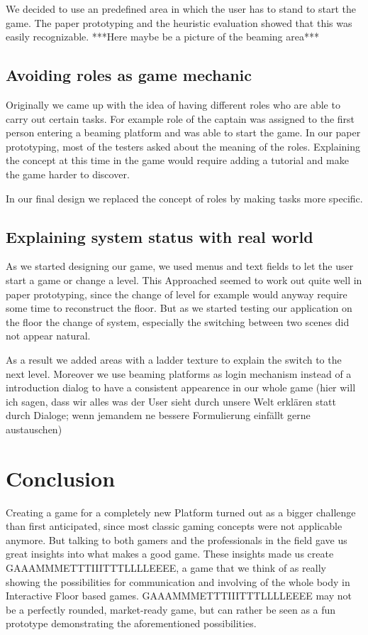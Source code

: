 \documentclass{sigchi}
\begin{document}
We decided to use an predefined area in which the user has to stand to start the game. The paper prototyping and the heuristic evaluation showed that this was easily recognizable. 
***Here maybe be a picture of the beaming area*** 


\subsection{Avoiding roles as game mechanic}
\vspace{1mm}
Originally we came up with the idea of having different roles who are able to carry out certain tasks. For example role of the captain was assigned to the first person entering a beaming platform and was able to start the game. In our paper prototyping, most of the testers asked about the meaning of the roles. Explaining the concept at this time in the game would require adding a tutorial and make the game harder to discover. 

In our final design we replaced the concept of roles by making tasks more specific.   

\subsection{Explaining system status with real world}
\vspace{1mm}
As we started designing our game, we used menus and text fields to let the user start a game or change a level. This Approached seemed to work out quite well in paper prototyping, since the change of level for example would anyway require some time to reconstruct the floor. But as we started testing our application on the floor the change of system, especially the switching between two scenes did not appear natural. 

As a result we added areas with a ladder texture to explain the switch to the next level. Moreover we use beaming platforms as login mechanism instead of a introduction dialog to have a consistent appearence in our whole game (hier will ich sagen, dass wir alles was der User sieht durch unsere Welt erklären statt durch Dialoge; wenn jemandem ne bessere Formulierung einfällt gerne austauschen)

\section{Conclusion}
\vspace{1mm}
Creating a game for a completely new Platform turned out as a bigger challenge than first anticipated, since most classic gaming concepts were not applicable anymore. But talking to both gamers and the professionals in the field gave us great insights into what makes a good game. These insights made us create GAAAMMMETTTIIITTTLLLLEEEE, a game that we think of as really showing the possibilities for communication and involving of the whole body in Interactive Floor based games. \newline
GAAAMMMETTTIIITTTLLLLEEEE may not be a perfectly rounded, market-ready game, but can rather be seen as a fun prototype demonstrating the aforementioned possibilities.


\balance
\end{document}
